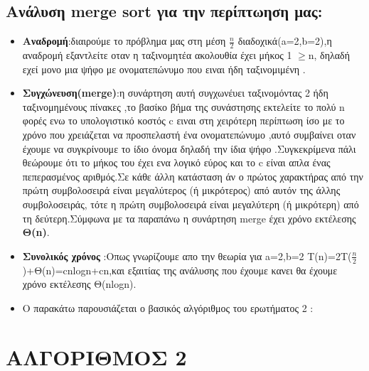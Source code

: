 \documentclass[a4paper]{article}
\begin{document}
\subsection*{Ανάλυση merge sort για την περίπτωηση μας:}
\begin{itemize}
    \item \textbf{Αναδρομή}:διαιρούμε το πρόβλημα μας στη μέση $\frac{n}{2}$ διαδοχικά(a=2,b=2),η αναδρομή εξαντλείτε  οταν η ταξινομητέα ακολουθία έχει μήκος 1 $\geq$n, δηλαδή εχεί μονο μια ψήφο με ονοματεπώνυμο που ειναι ήδη ταξινομιμένη . 
\end{itemize}
    \begin{itemize}
        \item \textbf{Συγχώνευση(merge)}:η συνάρτηση αυτή συγχωνέυει ταξινομόντας 2 ήδη ταξινομημένους πίνακες ,το βασίκο βήμα της συνάστησης εκτελείτε το πολύ n φορές ενω το υπολογιστικό κοστός c ειναι στη χειρότερη περίπτωση  ίσο με το χρόνο που χρειάζεται να προσπελαστή ένα ονοματεπώνυμο ,αυτό συμβαίνει οταν έχουμε να συγκρίνουμε το ίδιο όνομα δηλαδή την ίδια ψήφο .Συγκεκρίμενα  πάλι θεώρουμε ότι το μήκος του έχει ενα λογικό εύρος και το c είναι απλα ένας πεπερασμένος αριθμός.Σε κάθε άλλη κατάσταση άν ο πρώτος χαρακτήρας από την πρώτη συμβολοσειρά είναι μεγαλύτερος (ή μικρότερος) από αυτόν της άλλης συμβολοσειράς, τότε η πρώτη συμβολοσειρά είναι μεγαλύτερη (ή μικρότερη) από τη δεύτερη.Σύμφωνα με τα παραπάνω η συνάρτηση merge έχει χρόνο εκτέλεσης \textbf{Θ(n)}.
    \end{itemize}
     \begin{itemize}
         \item \textbf{Συνολικός χρόνος} :Οπως  γνωρίζουμε απο την θεωρία  για a=2,b=2  Τ(n)=2T($\frac{n}{2}$)+Θ(n)=cnlogn+cn,και εξαιτίας της ανάλυσης που έχουμε κανει θα έχουμε χρόνο εκτέλεσης Θ(nlogn).
     \end{itemize}
\newpage
\begin{itemize}
    \item Ο  παρακάτω παρουσιάζεται ο  βασικός αλγόριθμος του ερωτήματος 2 : 
             
\end{itemize}
    
            \section*{ ΑΛΓΟΡΙΘΜΟΣ 2}
\lstset{numbers=left, numbersep=5pt,frame=single,  framexleftmargin=15pt}
\end{document}
